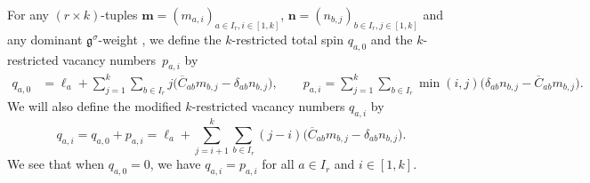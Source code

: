 \documentclass[10pt,a4paper]{amsart}
\numberwithin{equation}{section}
\begin{document}
For any $(r\times k)$-tuples $\mathbf{m}=(m_{a,i})_{a\in I_r,i\in[1,k]}$, $\mathbf{n}=(n_{b,j})_{b\in I_r,j\in[1,k]}$ and any dominant $\mathfrak{g}^{\sigma}$-weight , we define the $k$-restricted total spin $q_{a,0}$ and the $k$-restricted vacancy numbers~$p_{a,i}$ by
\begin{align*}
q_{a,0}&=\ell_a+\sum_{j=1}^k\sum_{b\in I_r}j\bigl(\overline{ C}_{ab}m_{b,j}-\delta_{ab}n_{b,j}\bigr),\qquad
p_{a,i}=\sum_{j=1}^k\sum_{b\in I_r}\min(i,j)\bigl(\delta_{ ab}n_{b,j}-\overline{C}_{ab}m_{b,j}\bigr).
\end{align*}
We will also define the modified $k$-restricted vacancy numbers $q_{a,i}$ by
\begin{equation}\label{eq:4.8}
q_{a,i}
=q_{a,0}+p_{a,i}
=\ell_a+\sum_{j=i+1}^k\sum_{b\in I_r}(j-i)\bigl(\overline{C}_{ab}m_{b,j}-\delta_{ab} n_{b,j}\bigr).
\end{equation}
We see that when $q_{a,0}=0$, we have $q_{a,i}=p_{a,i}$ for all $a\in I_r$ and $i\in[1,k]$.
\end{document}
